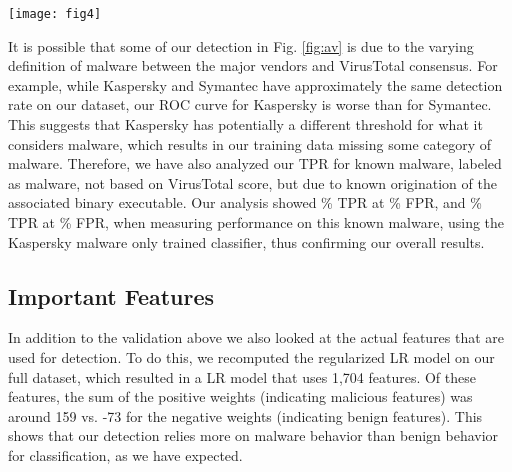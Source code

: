 \documentclass{sig-alternate-2013}
\begin{document}
\begin{figure*}[ht]
	\center
	\texttt{[image: fig4]}
   \caption{-fold validated ROC curves of malware that is detected by our classifier and is missed by antivirus engines. In each instance the model was only trained on antivirus detected data, and validated only on malware missed by that engine. (A) Validation on specific antivirus engines. Kaspersky, black squares, McAfee red x, and Symantec, blue triangle. (B) Validation on meta engines. Kaspersky+McAfee+Symantec, black squares, McAfee+Symantec, blue x. (C) The fraction of malware detected, based on VirusTotal score for the composite (all three) engine, at two false positive rates ( left and blue, and  right and yellow). Lower VirusTotal scores indicate malware that is harder to detect}
   	\label{fig:av}
\end{figure*}

It is possible that some of our detection in Fig. \ref{fig:av} is due to the varying definition of malware between the major vendors and VirusTotal consensus. For example, while Kaspersky and Symantec have approximately the same detection rate on our dataset, our ROC curve for Kaspersky is worse than for Symantec. This suggests that Kaspersky has potentially a different threshold for what it considers malware, which results in our training data missing some category of malware.  Therefore, we have also analyzed our TPR for known malware, labeled as malware, not based on VirusTotal score, but due to known origination of the associated binary executable. Our analysis showed \% TPR at \% FPR, and \% TPR at \% FPR, when measuring performance on this known malware, using the Kaspersky malware only trained classifier, thus confirming our overall results.

\subsection{Important Features}

In addition to the validation above we also looked at the actual features that are used for detection. To do this, we recomputed the regularized LR model on our full dataset, which resulted in a LR model that uses 1,704 features. Of these features, the sum of the positive weights (indicating malicious features) was around 159 vs. -73 for the negative weights (indicating benign features). This shows that our detection relies more on malware behavior than benign behavior for classification, as we have expected.
\end{document}
